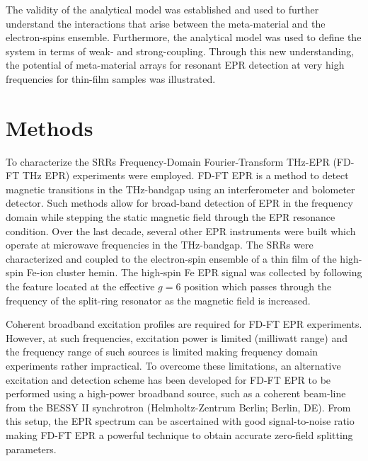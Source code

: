 The validity of the analytical model was established and used to further understand the interactions that arise between the meta-material and the electron-spins ensemble. Furthermore, the analytical model was used to define the system in terms of weak- and strong-coupling. Through this new understanding, the potential of meta-material arrays for resonant EPR detection at very high frequencies for thin-film samples was illustrated. 

\section{Methods}
To characterize the SRRs Frequency-Domain Fourier-Transform THz-EPR (FD-FT THz EPR) experiments were employed. FD-FT EPR is a method to detect magnetic transitions in the THz-bandgap using an interferometer and bolometer detector. \cite{Schnegg09,NEHRKORN201710} Such methods allow for broad-band detection of EPR in the frequency domain while stepping the static magnetic field through the EPR resonance condition. Over the last decade, several other EPR instruments were built which operate at microwave frequencies in the THz-bandgap. \cite{Disselhorst95, Hassan00, vanTol05, Zvyagin09, Takahashi09, C7CP07443C, Lu2017} The SRRs were characterized and coupled to the electron-spin ensemble of a thin film of the high-spin Fe-ion cluster hemin. The high-spin Fe EPR signal was collected by following the feature located at the effective $g=6$ position which passes through the frequency of the split-ring resonator as the magnetic field is increased. 

Coherent broadband excitation profiles are required for FD-FT EPR experiments. However, at such frequencies, excitation power is limited (milliwatt range) and the frequency range of such sources is limited making frequency domain experiments rather impractical. To overcome these limitations, an alternative excitation and detection scheme has been developed for FD-FT EPR to be performed using a high-power broadband source, such as a coherent beam-line from the BESSY II synchrotron (Helmholtz-Zentrum Berlin; Berlin, DE). From this setup, the EPR spectrum can be ascertained with good signal-to-noise ratio making FD-FT EPR a powerful technique to obtain accurate zero-field splitting parameters. \cite{Nehrkorn13,Nehrkorn15,NEHRKORN201710}

